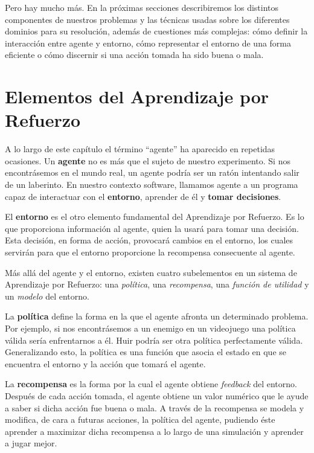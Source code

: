 Pero hay mucho más. En la próximas secciones describiremos los distintos componentes de nuestros problemas y las técnicas usadas sobre los diferentes dominios para su resolución, además de cuestiones más complejas: cómo definir la interacción entre agente y entorno, cómo representar el entorno de una forma eficiente o cómo discernir si una acción tomada ha sido buena o mala.


\section{Elementos del Aprendizaje por Refuerzo}

A lo largo de este capítulo el término ``agente'' ha aparecido en repetidas ocasiones. Un \textbf{agente} no es más que el sujeto de nuestro experimento. Si nos encontrásemos en el mundo real, un agente podría ser un ratón intentando salir de un laberinto. En nuestro contexto software, llamamos agente a un programa capaz de interactuar con el \textbf{entorno}, aprender de él y \textbf{tomar decisiones}.

El \textbf{entorno} es el otro elemento fundamental del Aprendizaje por Refuerzo. Es lo que proporciona información al agente, quien la usará para tomar una decisión. Esta decisión, en forma de acción, provocará cambios en el entorno, los cuales servirán para que el entorno proporcione la recompensa consecuente al agente.

Más allá del agente y el entorno, existen cuatro subelementos en un sistema de Aprendizaje por Refuerzo: una \textit{política}, una \textit{recompensa}, una \textit{función de utilidad} y un \textit{modelo} del entorno.

La \textbf{política} define la forma en la que el agente afronta un determinado problema. Por ejemplo, si nos encontrásemos a un enemigo en un videojuego una política válida sería enfrentarnos a él. Huir podría ser otra política perfectamente válida. Generalizando esto, la política es una función que asocia el estado en que se encuentra el entorno y la acción que tomará el agente.

La \textbf{recompensa} es la forma por la cual el agente obtiene \textit{feedback} del entorno. Después de cada acción tomada, el agente obtiene un valor numérico que le ayude a saber si dicha acción fue buena o mala. A través de la recompensa se modela y modifica, de cara a futuras acciones, la política del agente, pudiendo éste aprender a maximizar dicha recompensa a lo largo de una simulación y aprender a jugar mejor.

